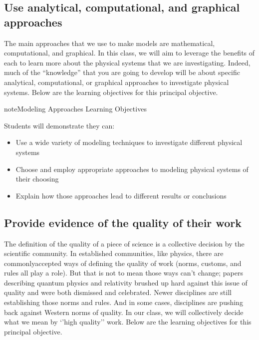 \documentclass[letterpaper,10pt,english]{jupyterBook}
\begin{document}
\subsection{Use analytical, computational, and graphical approaches}
\label{\detokenize{content/0_course/goals:use-analytical-computational-and-graphical-approaches}}
\sphinxAtStartPar
The main approaches that we use to make models are mathematical, computational, and graphical. In this class, we will aim to leverage the benefits of each to learn more about the physical systems that we are investigating. Indeed, much of the “knowledge” that you are going to develop will be about specific analytical, computational, or graphical approaches to investigate physical systems. Below are the learning objectives for this principal objective.

\begin{sphinxadmonition}{note}{Modeling Approaches Learning Objectives}

\sphinxAtStartPar
Students will demonstrate they can:
\begin{itemize}
\item {} 
\sphinxAtStartPar
Use a wide variety of modeling techniques to investigate different physical systems

\item {} 
\sphinxAtStartPar
Choose and employ appropriate approaches to modeling physical systems of their choosing

\item {} 
\sphinxAtStartPar
Explain how those approaches lead to different results or conclusions

\end{itemize}
\end{sphinxadmonition}


\subsection{Provide evidence of the quality of their work}
\label{\detokenize{content/0_course/goals:provide-evidence-of-the-quality-of-their-work}}
\sphinxAtStartPar
The definition of the quality of a piece of science is a collective decision by the scientific community. In established communities, like physics, there are commonly\sphinxhyphen{}accepted ways of defining the quality of work (norms, customs, and rules all play a role). But that is not to mean those ways can’t change; papers describing quantum physics and relativity brushed up hard against this issue of quality and were both dismissed and celebrated. Newer disciplines are still establishing those norms and rules. And in some cases, disciplines are pushing back against Western norms of quality. In our class, we will collectively decide what we mean by ‘’high quality’’ work. Below are the learning objectives for this principal objective.
\end{document}
